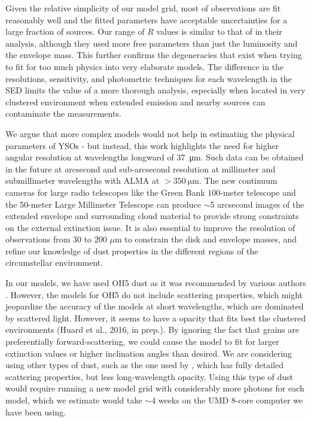 Given the relative simplicity of our model grid, most of observations are fit reasonably well and the fitted parameters have acceptable uncertainties for a large fraction of sources. Our range of $R$ values is similar to that of \citet{Furlan:2016df} in their analysis, although they used more free parameters than just the luminosity and the envelope mass. 
This further confirms the degeneracies that exist when trying to fit for too much physics into very elaborate models. The difference in the resolutions, sensitivity, and photometric techniques for each wavelength in the SED limits the value of a more thorough analysis, especially when located in very clustered environment when extended emission and nearby sources can contaminate the measurements. 

We argue that more complex models would not help in estimating the physical parameters of YSOs - but instead, this work highlights the need for higher angular resolution at wavelengths longward of \SI{37}{\um}. Such data can be obtained in the future at arcsecond and sub-arcsecond resolution at millimeter and submillimeter wavelengths with ALMA at $>\SI{350}{\um}$. The new continuum cameras for large radio telescopes like the Green  Bank 100-meter telescope and the 50-meter Large Millimeter Telescope can produce $\sim$5 arcsecond images of the extended envelope and surrounding cloud material to provide strong constraints on the external extinction issue. It is also essential to improve the resolution of observations from 30 to 200 $\mu$m to constrain the disk and envelope masses, and refine our knowledge of dust properties in the different regions of the circumstellar environment.

In our models, we have used OH5 dust as it was recommended by various authors \citep[e.g.][]{Dunham:2010bx}. However, the models for OH5 do not include scattering properties, which might jeopardize the accuracy of the models at short wavelengths, which are dominated by scattered light. However, it seems to have a opacity that fits best the clustered environments (Huard et al., 2016, in prep.). By ignoring the fact that grains are preferentially forward-scattering,  we could cause the model to fit for larger extinction values or higher inclination angles than desired. We are considering using other types of dust, such as the one used by \citet{Furlan:2016df}, which has fully detailed scattering properties, but less long-wavelength opacity. Using this type of dust would require running a new model grid with considerably more photons for each model, which we estimate would take $\sim 4$ weeks on the UMD 8-core computer we have been using. 

